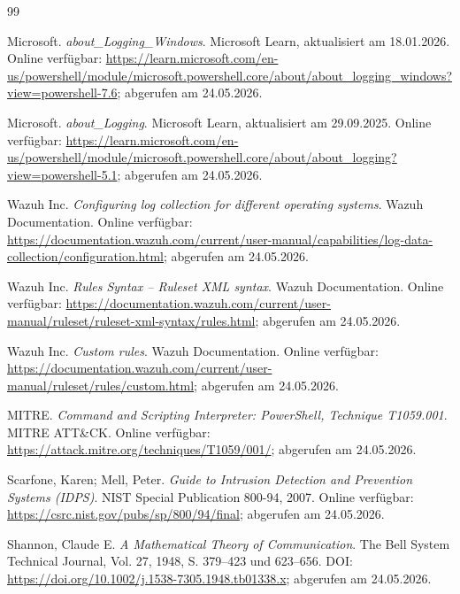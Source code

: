 \documentclass[12pt,a4paper,oneside,parskip=half]{scrreprt}
\begin{document}
\begin{thebibliography}{99}

Microsoft. \emph{about\_Logging\_Windows}. Microsoft Learn, aktualisiert am 18.01.2026. Online verfügbar: \url{https://learn.microsoft.com/en-us/powershell/module/microsoft.powershell.core/about/about_logging_windows?view=powershell-7.6}; abgerufen am 24.05.2026.

Microsoft. \emph{about\_Logging}. Microsoft Learn, aktualisiert am 29.09.2025. Online verfügbar: \url{https://learn.microsoft.com/en-us/powershell/module/microsoft.powershell.core/about/about_logging?view=powershell-5.1}; abgerufen am 24.05.2026.

Wazuh Inc. \emph{Configuring log collection for different operating systems}. Wazuh Documentation. Online verfügbar: \url{https://documentation.wazuh.com/current/user-manual/capabilities/log-data-collection/configuration.html}; abgerufen am 24.05.2026.

Wazuh Inc. \emph{Rules Syntax -- Ruleset XML syntax}. Wazuh Documentation. Online verfügbar: \url{https://documentation.wazuh.com/current/user-manual/ruleset/ruleset-xml-syntax/rules.html}; abgerufen am 24.05.2026.

Wazuh Inc. \emph{Custom rules}. Wazuh Documentation. Online verfügbar: \url{https://documentation.wazuh.com/current/user-manual/ruleset/rules/custom.html}; abgerufen am 24.05.2026.

MITRE. \emph{Command and Scripting Interpreter: PowerShell, Technique T1059.001}. MITRE ATT\&CK. Online verfügbar: \url{https://attack.mitre.org/techniques/T1059/001/}; abgerufen am 24.05.2026.

Scarfone, Karen; Mell, Peter. \emph{Guide to Intrusion Detection and Prevention Systems (IDPS)}. NIST Special Publication 800-94, 2007. Online verfügbar: \url{https://csrc.nist.gov/pubs/sp/800/94/final}; abgerufen am 24.05.2026.

Shannon, Claude E. \emph{A Mathematical Theory of Communication}. The Bell System Technical Journal, Vol. 27, 1948, S. 379--423 und 623--656. DOI: \url{https://doi.org/10.1002/j.1538-7305.1948.tb01338.x}; abgerufen am 24.05.2026.


\end{thebibliography}
\end{document}
